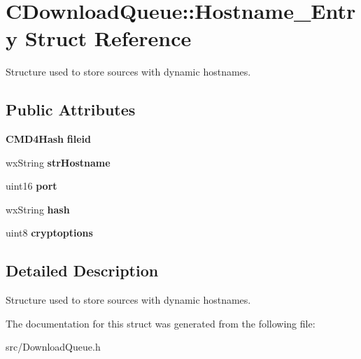 \section{CDownloadQueue::Hostname\_\-Entry Struct Reference}
\label{structCDownloadQueue_1_1Hostname__Entry}


Structure used to store sources with dynamic hostnames.  
\subsection*{Public Attributes}
\begin{DoxyCompactItemize}
\item 
{\bf CMD4Hash} {\bf fileid}\label{structCDownloadQueue_1_1Hostname__Entry_a49cf1d3e32561d15bd13d08fd17aacee}

\item 
wxString {\bf strHostname}\label{structCDownloadQueue_1_1Hostname__Entry_a88c739c1ae0a452742a272e7a688442f}

\item 
uint16 {\bf port}\label{structCDownloadQueue_1_1Hostname__Entry_adabef91dfcb4e8055ed7c5b19253229a}

\item 
wxString {\bf hash}\label{structCDownloadQueue_1_1Hostname__Entry_a1dc20df00973dba16a15a488cfb6d78c}

\item 
uint8 {\bf cryptoptions}\label{structCDownloadQueue_1_1Hostname__Entry_a8c9e2974f5489edd30e209f0bb3ad4b6}

\end{DoxyCompactItemize}


\subsection{Detailed Description}
Structure used to store sources with dynamic hostnames. 

The documentation for this struct was generated from the following file:\begin{DoxyCompactItemize}
\item 
src/DownloadQueue.h\end{DoxyCompactItemize}
